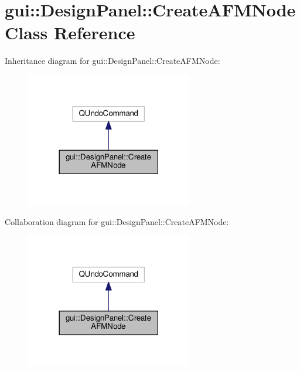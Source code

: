 \hypertarget{classgui_1_1DesignPanel_1_1CreateAFMNode}{}\section{gui\+:\+:Design\+Panel\+:\+:Create\+A\+F\+M\+Node Class Reference}
\label{classgui_1_1DesignPanel_1_1CreateAFMNode}


Inheritance diagram for gui\+:\+:Design\+Panel\+:\+:Create\+A\+F\+M\+Node\+:\nopagebreak
\begin{figure}[H]
\begin{center}
\leavevmode
\includegraphics[width=206pt]{classgui_1_1DesignPanel_1_1CreateAFMNode__inherit__graph}
\end{center}
\end{figure}


Collaboration diagram for gui\+:\+:Design\+Panel\+:\+:Create\+A\+F\+M\+Node\+:\nopagebreak
\begin{figure}[H]
\begin{center}
\leavevmode
\includegraphics[width=206pt]{classgui_1_1DesignPanel_1_1CreateAFMNode__coll__graph}
\end{center}
\end{figure}
